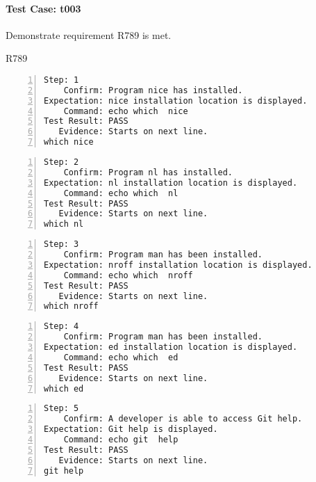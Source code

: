 \paragraph{Test Case: t003}
\begin{description}[align=right,leftmargin=*,labelindent=3cm]
\item[Purpose:] Demonstrate requirement R789 is met.
\item[Requirement:] R789
\end{description}
\begin{lstlisting}[numbers=left]
       Step: 1
    Confirm: Program nice has installed.
Expectation: nice installation location is displayed.
    Command: echo which  nice 
Test Result: PASS
   Evidence: Starts on next line.
which nice

\end{lstlisting}
\begin{lstlisting}[numbers=left]
       Step: 2
    Confirm: Program nl has installed.
Expectation: nl installation location is displayed.
    Command: echo which  nl 
Test Result: PASS
   Evidence: Starts on next line.
which nl

\end{lstlisting}
\begin{lstlisting}[numbers=left]
       Step: 3
    Confirm: Program man has been installed.
Expectation: nroff installation location is displayed.
    Command: echo which  nroff 
Test Result: PASS
   Evidence: Starts on next line.
which nroff

\end{lstlisting}
\begin{lstlisting}[numbers=left]
       Step: 4
    Confirm: Program man has been installed.
Expectation: ed installation location is displayed.
    Command: echo which  ed 
Test Result: PASS
   Evidence: Starts on next line.
which ed

\end{lstlisting}
\begin{lstlisting}[numbers=left]
       Step: 5
    Confirm: A developer is able to access Git help.
Expectation: Git help is displayed.
    Command: echo git  help 
Test Result: PASS
   Evidence: Starts on next line.
git help

\end{lstlisting}
